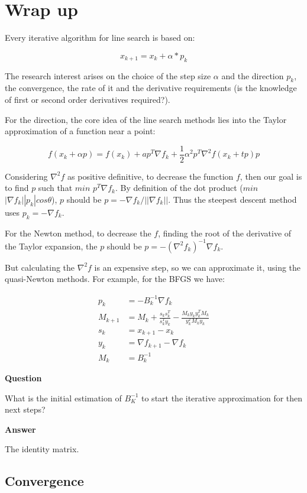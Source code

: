 \documentclass[a4paper,11pt]{article}
\numberwithin{equation}{section} %
\begin{document}
\section{Wrap up}

Every iterative algorithm for line search is based on:

\[x_{k+1} = x_k + \alpha*p_k\]

The research interest arises on the choice of the step size $\alpha$ and the direction $p_k$, the convergence, the rate of it and the derivative requirements (is the knowledge of first or second order derivatives required?).

For the direction,  
the core idea of the line search methods lies into the Taylor approximation of a function near a point:

\[f(x_k + \alpha p) = f(x_k) + a p^T \nabla f_k + \frac{1}{2} \alpha^2 p^T \nabla^2 f(x_k + tp) p\]

Considering $\nabla^2 f$ as positive definitive, to decrease the function $f$, then our goal is to find $p$ such that
$min$ $p^T \nabla f_k$. By definition of the dot product ($min$ $|\nabla f_k| |p_k| cos \theta$), $p$ should be $p = - \nabla f_k / ||\nabla f_k||$. Thus the steepest descent method uses $p_k = - \nabla f_k$.

For the Newton method, to decrease the $f$, finding the root of the derivative of the Taylor expansion, the $p$ should be $p = - (\nabla^2 f_k) ^{-1} \nabla f_k$.

But calculating the $\nabla^2 f$ is an expensive step, so we can approximate it, using the quasi-Newton methods. For example, for the BFGS we have:

\begin{align}
    p_k &= -B_k^{-1} \nabla f_k \\
    M_{k+1} &= M_k + \frac{s_k s_k^T}{s_k^T y_k} - \frac{M_k y_k y_k^T M_k}{y_k^T M_k y_k} \\
    s_k &= x_{k+1} - x_k \\
    y_k &= \nabla f_{k+1} - \nabla f_k \\
    M_k &= B_k^{-1}
\end{align}

\textbf{Question}

What is the initial estimation of $B_K^{-1}$ to start the iterative approximation for then next steps?

\textbf{Answer}

The identity matrix.

\subsection{Convergence}
\end{document}
